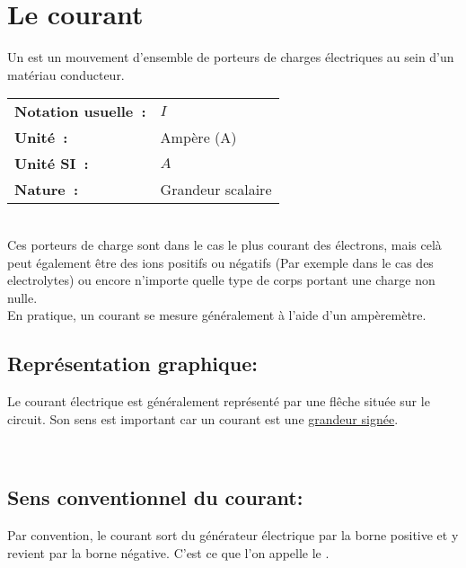 \section{Le courant}

Un  est un mouvement d'ensemble de porteurs de charges électriques au sein d'un matériau conducteur. \\

\begin{tabular}{ll}
\textbf{Notation usuelle~:} & $I$ \\
	\textbf{Unité~:} & Ampère (A) \\
\textbf{Unité SI~:} & $A$ \\
\textbf{Nature~:} & Grandeur scalaire \\
\end{tabular} \\

Ces porteurs de charge sont dans le cas le plus courant des électrons, mais celà peut également être des ions positifs ou négatifs (Par exemple dans le cas des electrolytes) ou encore n'importe quelle type de corps portant une charge non nulle. \\

En pratique, un courant se mesure généralement à l'aide d'un ampèremètre. 
\subsection*{ Représentation graphique: }

\begin{minipage}{7cm}
	 
\end{minipage}
\hspace{1cm}
\begin{minipage}{7cm}
	Le courant électrique est généralement représenté par une flêche située sur le circuit. Son sens est important car un courant est une \underline{grandeur signée}. 
\end{minipage}\\


\subsection*{ Sens conventionnel du courant: }

Par convention, le courant sort du générateur électrique par la borne positive et y revient par la borne négative. C'est ce que l'on appelle le . \\

